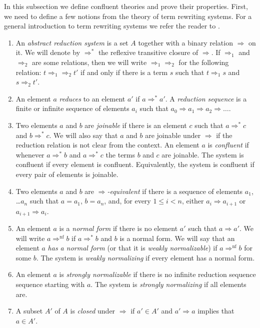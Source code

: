 \documentclass[reqno]{amsart}
\theoremstyle{definition}
\theoremstyle{remark}
\newcommand{\nf}{\mathrm{nf}}
\numberwithin{figure}{section}
\begin{document}
In this subsection we define confluent theories and prove their properties.
First, we need to define a few notions from the theory of term rewriting systems.
For a general introduction to term rewriting systems we refer the reader to \cite{Terese,klop-trs,ohlebusch-advanced}.
\begin{enumerate}
\item An \emph{abstract reduction system} is a set $A$ together with a binary relation $\Rightarrow$ on it.
We will denote by $\Rightarrow^*$ the reflexive transitive closure of $\Rightarrow$.
If $\Rightarrow_1$ and $\Rightarrow_2$ are some relations, then we will write $\Rightarrow_1 \Rightarrow_2$ for the following relation:
$t \Rightarrow_1 \Rightarrow_2 t'$ if and only if there is a term $s$ such that $t \Rightarrow_1 s$ and $s \Rightarrow_2 t'$.
\item An element $a$ \emph{reduces} to an element $a'$ if $a \Rightarrow^* a'$.
A \emph{reduction sequence} is a finite or infinite sequence of elements $a_i$ such that $a_0 \Rightarrow a_1 \Rightarrow a_2 \Rightarrow \ldots$.
\item Two elements $a$ and $b$ are \emph{joinable} if there is an element $c$ such that $a \Rightarrow^* c$ and $b \Rightarrow^* c$.
We will also say that $a$ and $b$ are joinable under $\Rightarrow$ if the reduction relation is not clear from the context.
An element $a$ is \emph{confluent} if whenever $a \Rightarrow^* b$ and $a \Rightarrow^* c$ the terms $b$ and $c$ are joinable.
The system is confluent if every element is confluent.
Equivalently, the system is confluent if every pair of elements is joinable.
\item Two elements $a$ and $b$ are \emph{$\Rightarrow$-equivalent} if there is a sequence of elements $a_1$, \ldots $a_n$ such that $a = a_1$, $b = a_n$,
and, for every $1 \leq i < n$, either $a_i \Rightarrow a_{i+1}$ or $a_{i+1} \Rightarrow a_i$.
\item An element $a$ is a \emph{normal form} if there is no element $a'$ such that $a \Rightarrow a'$.
We will write $a \Rightarrow^\nf b$ if $a \Rightarrow^* b$ and $b$ is a normal form.
We will say that an element $a$ \emph{has a normal form} (or that it is \emph{weakly normalizable}) if $a \Rightarrow^\nf b$ for some $b$.
The system is \emph{weakly normalizing} if every element has a normal form.
\item An element $a$ is \emph{strongly normalizable} if there is no infinite reduction sequence sequence starting with $a$.
The system is \emph{strongly normalizing} if all elements are.
\item A subset $A'$ of $A$ is \emph{closed} under $\Rightarrow$ if $a' \in A'$ and $a' \Rightarrow a$ implies that $a \in A'$.
\end{enumerate}
\end{document}
